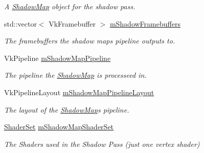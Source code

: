 \begin{DoxyCompactItemize}
\begin{DoxyCompactList}\small\item\em A \mbox{\hyperlink{struct_shadow_map}{Shadow\+Map}} object for the shadow pass. \end{DoxyCompactList}\item 
\mbox{\label{class_render_system_adf4469364daea6a3da34bd5d66d4f605}} 
std\+::vector$<$ Vk\+Framebuffer $>$ \mbox{\hyperlink{class_render_system_adf4469364daea6a3da34bd5d66d4f605}{m\+Shadow\+Framebuffers}}
\begin{DoxyCompactList}\small\item\em The framebuffers the shadow map\textquotesingle{}s pipeline outputs to. \end{DoxyCompactList}\item 
\mbox{\label{class_render_system_adc913051b690f4bf0630d84051b2473c}} 
Vk\+Pipeline \mbox{\hyperlink{class_render_system_adc913051b690f4bf0630d84051b2473c}{m\+Shadow\+Map\+Pipeline}}
\begin{DoxyCompactList}\small\item\em The pipeline the \mbox{\hyperlink{struct_shadow_map}{Shadow\+Map}} is processeed in. \end{DoxyCompactList}\item 
\mbox{\label{class_render_system_a6dd71a293209144f66f4b7b8b16a0024}} 
Vk\+Pipeline\+Layout \mbox{\hyperlink{class_render_system_a6dd71a293209144f66f4b7b8b16a0024}{m\+Shadow\+Map\+Pipeline\+Layout}}
\begin{DoxyCompactList}\small\item\em The layout of the \mbox{\hyperlink{struct_shadow_map}{Shadow\+Map}}\textquotesingle{}s pipeline. \end{DoxyCompactList}\item 
\mbox{\label{class_render_system_aee2e765044f2fb4cd1ffd9c7b0696bde}} 
\mbox{\hyperlink{struct_shader_set}{Shader\+Set}} \mbox{\hyperlink{class_render_system_aee2e765044f2fb4cd1ffd9c7b0696bde}{m\+Shadow\+Map\+Shader\+Set}}
\begin{DoxyCompactList}\small\item\em The Shaders used in the Shadow Pass (just one vertex shader) \end{DoxyCompactList}\item 

\end{DoxyCompactItemize}
